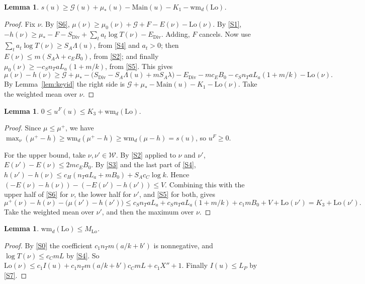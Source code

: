 \documentclass[11pt]{amsart}
\theoremstyle{plain}
\newtheorem{lemma}[theorem]{Lemma}
\theoremstyle{definition}
\numberwithin{equation}{section}
\begin{document}
\begin{lemma}\label{lem:slower}
$s(u)\ge\mathcal G(u)+\mu_\ast(u)-\mathrm{Main}(u)-K_1-\mathrm{wm}_d(\mathrm{Lo})$.
\end{lemma}

\begin{proof}
Fix $\nu$. By \ref{S6}, $\mu(\nu)\ge\mu_0(\nu)+\mathcal G+F-E(\nu)-\mathrm{Lo}(\nu)$. By \ref{S1},
$-h(\nu)\ge\mu_\ast-F-S_{\mathrm{Div}}+\sum_ta_t\log T(\nu)-E_{\mathrm{Div}}$. Adding, $F$ cancels. Now
use $\sum_ta_t\log T(\nu)\ge S_A\Lambda(u)$, from \ref{S4} and $a_t>0$; then
$E(\nu)\le m(S_A\lambda+c_EB_0)$, from \ref{S2}; and finally
$\mu_0(\nu)\ge-c_Sn_TaL_a(1+m/k)$, from \ref{S5}. This gives
\[
\mu(\nu)-h(\nu)\ge\mathcal G+\mu_\ast-\bigl(S_{\mathrm{Div}}-S_A\Lambda(u)+mS_A\lambda\bigr)-E_{\mathrm{Div}}-mc_EB_0-c_Sn_TaL_a(1+m/k)-\mathrm{Lo}(\nu).
\]
By Lemma~\ref{lem:keyid} the right side is $\mathcal G+\mu_\ast-\mathrm{Main}(u)-K_1-\mathrm{Lo}(\nu)$.
Take the weighted mean over $\nu$.
\end{proof}

\begin{lemma}\label{lem:uF}
$0\le u^F(u)\le K_3+\mathrm{wm}_d(\mathrm{Lo})$.
\end{lemma}

\begin{proof}
Since $\mu\le\mu^+$, we have
$\max_\nu(\mu^+-h)\ge\mathrm{wm}_d(\mu^+-h)\ge\mathrm{wm}_d(\mu-h)=s(u)$, so $u^F\ge0$.

For the upper bound, take $\nu,\nu'\in\mathcal W$. By \ref{S2} applied to $\nu$ and $\nu'$,
$E(\nu')-E(\nu)\le2mc_EB_0$. By \ref{S3} and the last part of \ref{S4},
$h(\nu')-h(\nu)\le c_H(n_TaL_a+mB_0)+S_Ac_C\log k$. Hence
$(-E(\nu)-h(\nu))-(-E(\nu')-h(\nu'))\le V$. Combining this with the upper half of \ref{S6} for
$\nu$, the lower half for $\nu'$, and \ref{S5} for both, gives
\[
\mu^+(\nu)-h(\nu)-\bigl(\mu(\nu')-h(\nu')\bigr)\le c_Sn_TaL_a+c_Sn_TaL_a(1+m/k)+c_1mB_0+V+\mathrm{Lo}(\nu')=K_3+\mathrm{Lo}(\nu').
\]
Take the weighted mean over $\nu'$, and then the maximum over $\nu$.
\end{proof}

\begin{lemma}\label{lem:Lomean}
$\mathrm{wm}_d(\mathrm{Lo})\le M_{\mathrm{Lo}}$.
\end{lemma}

\begin{proof}
By \ref{S0} the coefficient $c_1n_Tm(a/k+b')$ is nonnegative, and $\log T(\nu)\le c_CmL$ by
\ref{S4}. So $\mathrm{Lo}(\nu)\le c_1I(u)+c_1n_Tm(a/k+b')c_CmL+c_1X''+1$. Finally
$I(u)\le L_P$ by \ref{S7}.
\end{proof}
\end{document}
